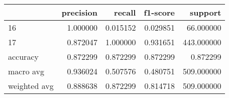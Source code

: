 \begin{tabular}{lrrrr}
\toprule
 & precision & recall & f1-score & support \\
\midrule
16 & 1.000000 & 0.015152 & 0.029851 & 66.000000 \\
17 & 0.872047 & 1.000000 & 0.931651 & 443.000000 \\
accuracy & 0.872299 & 0.872299 & 0.872299 & 0.872299 \\
macro avg & 0.936024 & 0.507576 & 0.480751 & 509.000000 \\
weighted avg & 0.888638 & 0.872299 & 0.814718 & 509.000000 \\
\bottomrule
\end{tabular}
